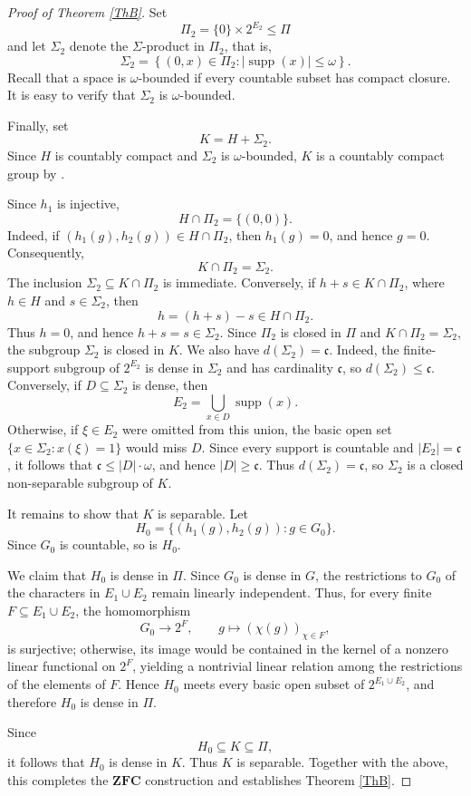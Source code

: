 \documentclass[12pt]{amsart}
\theoremstyle{definition}
\numberwithin{equation}{section}
\theoremstyle{remark}
\begin{document}
\begin{proof}[Proof of Theorem \ref{ThB}]
Set
\[
\Pi_2=\{0\}\times 2^{E_2}\leq \Pi
\]
and let $\Sigma_2$ denote the $\Sigma$-product in $\Pi_2$, that is,
\[
\Sigma_2=\left\{(0,x)\in\Pi_2:
|\operatorname{supp}(x)|\leq\omega\right\}.
\]
Recall that a space is $\omega$-bounded if every countable subset has compact closure. It is easy to verify that $\Sigma_2$ is $\omega$-bounded.

Finally, set
\[
K=H+\Sigma_2.
\]
Since $H$ is countably compact and $\Sigma_2$ is $\omega$-bounded, $K$ is a countably compact group by \cite[Lemma~5.4]{LMT}.

Since $h_1$ is injective,
\[
H\cap\Pi_2=\{(0,0)\}.
\]
Indeed, if $(h_1(g),h_2(g))\in H\cap\Pi_2$, then $h_1(g)=0$, and hence $g=0$. Consequently,
\[
K\cap\Pi_2=\Sigma_2.
\]
The inclusion $\Sigma_2\subseteq K\cap\Pi_2$ is immediate. Conversely,
if $h+s\in K\cap\Pi_2$, where $h\in H$ and $s\in\Sigma_2$, then
\[
h=(h+s)-s\in H\cap\Pi_2.
\]
Thus $h=0$, and hence $h+s=s\in\Sigma_2$.
Since $\Pi_2$ is closed in $\Pi$ and $K\cap\Pi_2=\Sigma_2$, the subgroup $\Sigma_2$ is closed in $K$. We also have $d(\Sigma_2)=\mathfrak c$. Indeed, the finite-support subgroup of $2^{E_2}$ is dense in $\Sigma_2$ and has cardinality $\mathfrak c$, so $d(\Sigma_2)\leq\mathfrak c$. Conversely, if $D\subseteq\Sigma_2$ is dense, then
\[
E_2=\bigcup_{x\in D}\operatorname{supp}(x).
\]
Otherwise, if $\xi\in E_2$ were omitted from this union, the basic open set $\{x\in\Sigma_2:x(\xi)=1\}$ would miss $D$. Since every support is countable and $|E_2|=\mathfrak c$, it follows that $\mathfrak c\leq |D|\cdot\omega$, and hence $|D|\geq\mathfrak c$. Thus $d(\Sigma_2)=\mathfrak c$, so $\Sigma_2$ is a closed non-separable subgroup of $K$.

It remains to show that $K$ is separable. Let
\[
H_0=\{(h_1(g),h_2(g)):g\in G_0\}.
\]
Since $G_0$ is countable, so is $H_0$. 

We claim that $H_0$ is dense in $\Pi$. Since $G_0$ is dense in $G$, the restrictions to $G_0$ of the
characters in $E_1\cup E_2$ remain linearly independent. Thus, for
every finite $F\subseteq E_1\cup E_2$, the homomorphism
\[
G_0\longrightarrow 2^F,\qquad
g\longmapsto(\chi(g))_{\chi\in F},
\]
is surjective; otherwise, its image would be contained in the kernel of a nonzero linear functional on $2^F$, yielding a nontrivial linear relation among the restrictions of the elements of $F$. Hence $H_0$ meets every basic open subset of $2^{E_1\cup E_2}$, and therefore $H_0$ is dense in $\Pi$.

Since
\[
H_0\subseteq K\subseteq\Pi,
\]
it follows that $H_0$ is dense in $K$. Thus $K$ is separable.
Together with the above, this completes the $\mathbf{ZFC}$ construction and establishes Theorem \ref{ThB}.\end{proof}
\end{document}
